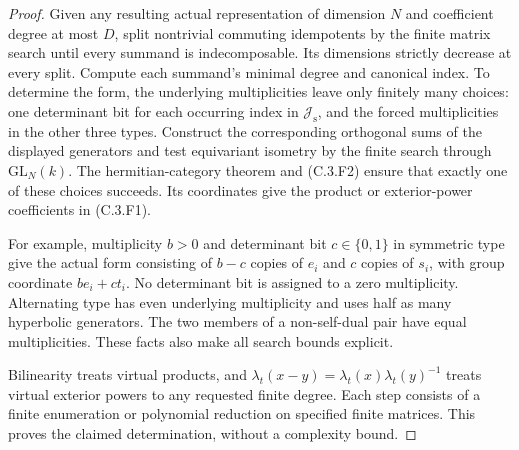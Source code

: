 \begin{proof}
Given any resulting actual representation of dimension $N$ and coefficient
degree at most $D$, split nontrivial commuting idempotents by the finite
matrix search until every summand is indecomposable. Its dimensions
strictly decrease at every split. Compute each summand's minimal degree
and canonical index. To determine the form, the underlying multiplicities
leave only finitely many choices: one determinant bit for each occurring
index in $\mathscr J_{\mathrm s}$, and the forced multiplicities in the
other three types. Construct the corresponding orthogonal sums of the
displayed generators and test equivariant isometry by the finite search
through $\mathrm{GL}_N(k)$. The hermitian-category theorem and (C.3.F2)
ensure that exactly one of these choices succeeds. Its coordinates give
the product or exterior-power coefficients in (C.3.F1).

For example, multiplicity $b>0$ and determinant bit $c\in\{0,1\}$
in symmetric type give the actual form consisting of $b-c$ copies of
$e_i$ and $c$ copies of $s_i$, with group coordinate $be_i+ct_i$.
No determinant bit is assigned to a zero multiplicity. Alternating type
has even underlying multiplicity and uses half as many hyperbolic
generators. The two members of a non-self-dual pair have equal
multiplicities. These facts also make all search bounds explicit.

Bilinearity treats virtual products, and
$\lambda_t(x-y)=\lambda_t(x)\lambda_t(y)^{-1}$ treats virtual exterior
powers to any requested finite degree. Each step consists of a finite
enumeration or polynomial reduction on specified finite matrices. This
proves the claimed determination, without a complexity bound.
\end{proof}

